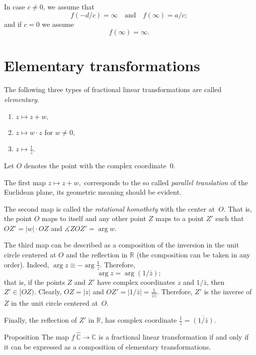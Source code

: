 In case $c\not=0$, we assume that
$$f(-d/c) = \infty
\quad
\text{and}
\quad
f(\infty) = a/c;$$
and if $c=0$ we assume
$$f(\infty) = \infty.$$





\section*{Elementary transformations}

The following three types of fractional linear transformations are called \emph{elementary}.

\begin{enumerate}
\item $z\mapsto z+w,$
\item $z\mapsto w\cdot z$ for $w\ne0,$
\item $z\mapsto \frac1z.$
\end{enumerate}
 
Let $O$ denotes the point with the complex coordinate~$0$.

The first map $z\mapsto z+w,$ corresponds to the so called 
\emph{parallel translation} 
of the Euclidean plane, its geometric meaning should be evident.

The second map is called the \emph{rotational homothety} with the center at~$O$.
That is, the point $O$ maps to itself
and any other point $Z$ maps to a point $Z'$ such that $OZ'=|w|\cdot OZ$ and $\measuredangle ZOZ'=\arg w$.

The third map can be described as a composition of the inversion in the unit circle centered at $O$ and the reflection in $\mathbb{R}$ 
(the composition can be taken in any order).
Indeed, $\arg z\equiv -\arg \tfrac1z$.
Therefore, 
$$\arg z=\arg (1/\bar z);$$
that is, if the points $Z$ and $Z'$ have complex coordinates $z$ and $1/\bar z$,
then $Z'\in[OZ)$.
Clearly, $OZ=|z|$ and $OZ'=|1/\bar z|=\tfrac{1}{|z|}$.
Therefore, $Z'$ is the inverse of $Z$ in the unit circle centered at~$O$.

Finally, the reflection of $Z'$ in $\mathbb{R}$, 
has complex coordinate $\tfrac1z=\overline{(1/\bar z)}$.

\begin{thm}{Proposition}\label{prop:mob-comp}
The map $f\:\hat{\mathbb{C}}\to\hat{\mathbb{C}}$ is a fractional linear transformation if and only if it can be expressed as a composition of elementary transformations. 
\end{thm}

